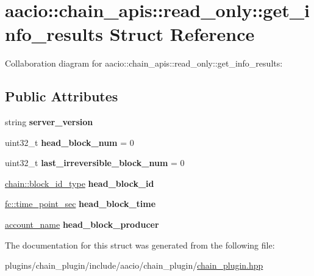 \hypertarget{structaacio_1_1chain__apis_1_1read__only_1_1get__info__results}{}\section{aacio\+:\+:chain\+\_\+apis\+:\+:read\+\_\+only\+:\+:get\+\_\+info\+\_\+results Struct Reference}
\label{structaacio_1_1chain__apis_1_1read__only_1_1get__info__results}


Collaboration diagram for aacio\+:\+:chain\+\_\+apis\+:\+:read\+\_\+only\+:\+:get\+\_\+info\+\_\+results\+:
\subsection*{Public Attributes}
\begin{DoxyCompactItemize}
\item 
\mbox{\label{structaacio_1_1chain__apis_1_1read__only_1_1get__info__results_a02ad729785f79815274aa2e93c821c26}} 
string {\bfseries server\+\_\+version}
\item 
\mbox{\label{structaacio_1_1chain__apis_1_1read__only_1_1get__info__results_af6d3eba3b187af9a142278fda6831e95}} 
uint32\+\_\+t {\bfseries head\+\_\+block\+\_\+num} = 0
\item 
\mbox{\label{structaacio_1_1chain__apis_1_1read__only_1_1get__info__results_af06c4f813ae7a7a9b9539ff9f21fb281}} 
uint32\+\_\+t {\bfseries last\+\_\+irreversible\+\_\+block\+\_\+num} = 0
\item 
\mbox{\label{structaacio_1_1chain__apis_1_1read__only_1_1get__info__results_a3e6fb1891e8eb8c6f949ca7bc481e895}} 
\mbox{\hyperlink{classfc_1_1sha256}{chain\+::block\+\_\+id\+\_\+type}} {\bfseries head\+\_\+block\+\_\+id}
\item 
\mbox{\label{structaacio_1_1chain__apis_1_1read__only_1_1get__info__results_ad6a76cd7cf9e47e0736e750a26f655ef}} 
\mbox{\hyperlink{classfc_1_1time__point__sec}{fc\+::time\+\_\+point\+\_\+sec}} {\bfseries head\+\_\+block\+\_\+time}
\item 
\mbox{\label{structaacio_1_1chain__apis_1_1read__only_1_1get__info__results_a2d2e657fb05b708f272f722bcd5b9ed7}} 
\mbox{\hyperlink{structaacio_1_1chain_1_1name}{account\+\_\+name}} {\bfseries head\+\_\+block\+\_\+producer}
\end{DoxyCompactItemize}


The documentation for this struct was generated from the following file\+:\begin{DoxyCompactItemize}
\item 
plugins/chain\+\_\+plugin/include/aacio/chain\+\_\+plugin/\mbox{\hyperlink{chain__plugin_8hpp}{chain\+\_\+plugin.\+hpp}}\end{DoxyCompactItemize}

